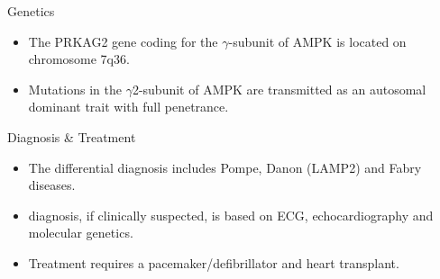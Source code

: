 \documentclass[presentation, smaller]{beamer}
\begin{document}
\begin{frame}[label={sec:orgb6c9a3a}]{Genetics}
\begin{itemize}
\item The PRKAG2 gene coding for the \(\gamma\)-subunit of AMPK is located on chromosome 7q36.
\item Mutations in the \(\gamma\)2-subunit of AMPK are transmitted as an
autosomal dominant trait with full penetrance.
\end{itemize}
\end{frame}

\begin{frame}[label={sec:orgd375c27}]{Diagnosis \& Treatment}
\begin{itemize}
\item The differential diagnosis includes Pompe, Danon (LAMP2) and Fabry diseases.

\item diagnosis, if clinically suspected, is based on ECG,
echocardiography and molecular genetics.

\item Treatment requires a pacemaker/defibrillator and heart transplant.
\end{itemize}
\end{frame}
\end{document}
